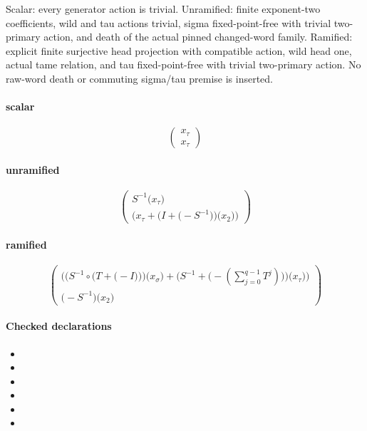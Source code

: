 Scalar: every generator action is trivial. Unramified: finite exponent-two coefficients, wild and tau actions trivial, sigma fixed-point-free with trivial two-primary action, and death of the actual pinned changed-word family. Ramified: explicit finite surjective head projection with compatible action, wild head one, actual tame relation, and tau fixed-point-free with trivial two-primary action. No raw-word death or commuting sigma/tau premise is inserted.

\paragraph{scalar}
\[\begin{pmatrix}x_{\tau}\\x_{\tau}\end{pmatrix}\]
\paragraph{unramified}
\[\begin{pmatrix}S^{-1}\bigl(x_{\tau}\bigr)\\\bigl(x_{\tau}+\bigl(I+\bigl(-S^{-1}\bigr)\bigr)\bigl(x_{2}\bigr)\bigr)\end{pmatrix}\]
\paragraph{ramified}
\[\begin{pmatrix}\bigl(\bigl(S^{-1}\circ \bigl(T+\bigl(-I\bigr)\bigr)\bigr)\bigl(x_{\sigma}\bigr)+\bigl(S^{-1}+\bigl(-\left(\sum_{j=0}^{q-1}T^{j}\right)\bigr)\bigr)\bigl(x_{\tau}\bigr)\bigr)\\\bigl(-S^{-1}\bigr)\bigl(x_{2}\bigr)\end{pmatrix}\]
\paragraph{Checked declarations}
\begin{itemize}
\item {}
\item {}
\item {}
\item {}
\item {}
\item {}
\end{itemize}

